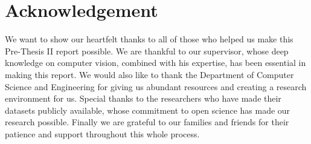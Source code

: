 \section*{Acknowledgement}


We want to show our heartfelt thanks to all of those who helped us make this Pre-Thesis II report possible. We are thankful to our supervisor, whose deep knowledge on computer vision, combined with his expertise, has been essential in making this report. We would also like to thank the Department of Computer Science and Engineering for giving us abundant resources and creating a research environment for us. Special thanks to the researchers who have made their datasets publicly available, whose commitment to open science has made our research possible. Finally we are grateful to our families and friends for their patience and support throughout this whole process.

\pagebreak
